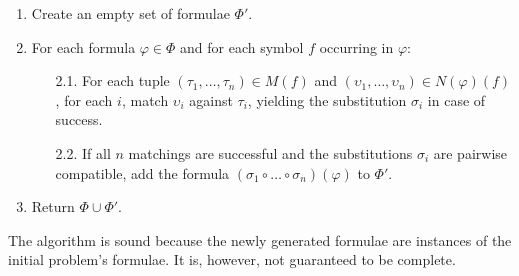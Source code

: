 \documentclass[runningheads]{llncs}
\begin{document}
\begin{enumerate}

   \item Create an empty set of formulae \(\Phi'\).

   \item For each formula \(\varphi \in \Phi\) and for each symbol \(f\) occurring in \(\varphi\):
   \begin{enumerate}
    \item[2.1.] For each tuple \((\tau_1, \dots, \tau_n) \in  M(f)\) and \((\upsilon_1, \dots, \upsilon_n) \in N(\varphi)(f)\),
     for each \(i\), match \(\upsilon_i\) against \(\tau_i\), yielding the substitution \(\sigma_i\) in case of success.

    \item[2.2.] If all \(n\) matchings are successful and the substitutions \(\sigma_i\) are pairwise compatible,
add the formula \((\sigma_1 \circ \dots \circ \sigma_n)(\varphi)\) to \(\Phi'\).
   \end{enumerate}

   \item Return \(\Phi \cup \Phi'\).

\end{enumerate}

The algorithm is sound because the newly generated formulae are instances of the initial problem's formulae. %
It is, however, not guaranteed to be complete.
\end{document}
